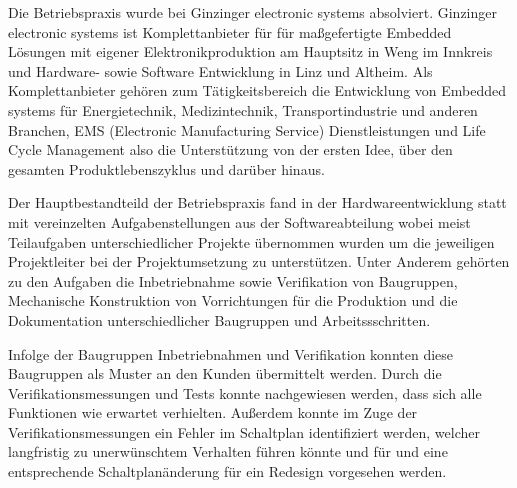 \documentclass[praktikum,german]{hgbthesis}
\begin{document}




Die Betriebspraxis wurde bei Ginzinger electronic systems absolviert. 
Ginzinger electronic systems ist Komplettanbieter für für maßgefertigte Embedded Lösungen mit 
eigener Elektronikproduktion am Hauptsitz in Weng im Innkreis und Hardware- sowie Software 
Entwicklung in Linz und Altheim. Als Komplettanbieter gehören zum Tätigkeitsbereich
die Entwicklung von Embedded systems für Energietechnik, Medizintechnik, 
Transportindustrie und anderen Branchen, EMS (Electronic Manufacturing Service) Dienstleistungen und Life Cycle Management 
also die Unterstützung von der ersten Idee, über den gesamten Produktlebenszyklus und darüber hinaus.\cite{Ginzinger}

Der Hauptbestandteild der Betriebspraxis fand in der Hardwareentwicklung statt mit vereinzelten Aufgabenstellungen 
aus der Softwareabteilung wobei meist Teilaufgaben unterschiedlicher Projekte übernommen wurden um 
die jeweiligen Projektleiter bei der Projektumsetzung zu unterstützen. Unter Anderem gehörten zu den Aufgaben 
die Inbetriebnahme sowie Verifikation von Baugruppen, Mechanische Konstruktion von Vorrichtungen für die 
Produktion und die Dokumentation unterschiedlicher Baugruppen und Arbeitssschritten. 

Infolge der Baugruppen Inbetriebnahmen und Verifikation konnten diese Baugruppen 
als Muster an den Kunden übermittelt werden. Durch die Verifikationsmessungen und Tests
konnte nachgewiesen werden, dass sich alle Funktionen wie erwartet verhielten. Außerdem konnte 
im Zuge der Verifikationsmessungen ein Fehler im Schaltplan identifiziert werden, welcher 
langfristig zu unerwünschtem Verhalten führen könnte und für und eine entsprechende 
Schaltplanänderung für ein Redesign vorgesehen werden.
\end{document}
